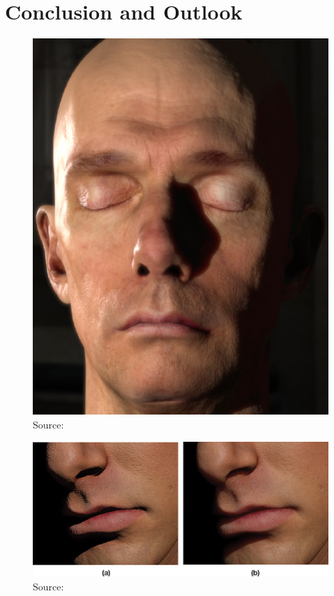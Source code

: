 \documentclass[ngerman,runningheads,a4paper]{llncs}[2018/03/10]
\begin{document}
\section{Conclusion and Outlook}
\label{sec:outlook}

\begin{figure}[!h]
  \centering
  \includegraphics[scale=0.275,keepaspectratio]{./images/nvidia-result.jpg}
  \caption{Source: \citet{efficient-human-skin-rendering}}
\end{figure}

\begin{figure}[!h]
  \centering
  \includegraphics[scale=0.9,keepaspectratio]{./images/skin-rendering-with-without-sss.jpg}
  \caption{Source: \citet{efficient-human-skin-rendering}}
\end{figure}
\end{document}
